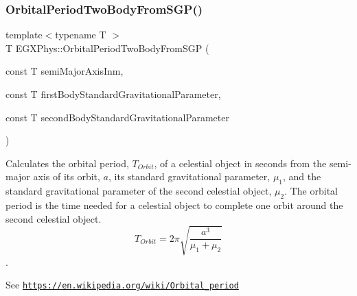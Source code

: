 \subsubsection{\texorpdfstring{Orbital\+Period\+Two\+Body\+From\+S\+G\+P()}{OrbitalPeriodTwoBodyFromSGP()}}
{\footnotesize\ttfamily template$<$typename T $>$ \\
T E\+G\+X\+Phys\+::\+Orbital\+Period\+Two\+Body\+From\+S\+GP (\begin{DoxyParamCaption}\item[{const T}]{semi\+Major\+Axis\+Inm,  }\item[{const T}]{first\+Body\+Standard\+Gravitational\+Parameter,  }\item[{const T}]{second\+Body\+Standard\+Gravitational\+Parameter }\end{DoxyParamCaption})}



Calculates the orbital period, $T_{Orbit}$, of a celestial object in seconds from the semi-\/major axis of its orbit, $a$, its standard gravitational parameter, $\mu_1$, and the standard gravitational parameter of the second celestial object, $\mu_2$. The orbital period is the time needed for a celestial object to complete one orbit around the second celestial object. \[ T_{Orbit}=2\pi\sqrt{\dfrac{a^3}{\mu_1 + \mu_2}}\]. 

See \href{https://en.wikipedia.org/wiki/Orbital_period}{\tt https\+://en.\+wikipedia.\+org/wiki/\+Orbital\+\_\+period}


